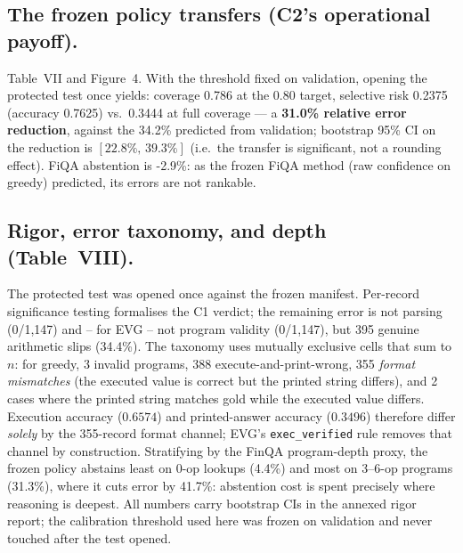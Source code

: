 \documentclass[conference]{IEEEtran}
\begin{document}
\subsection{The frozen policy transfers (C2's operational payoff).}
Table~VII and Figure~4. With the threshold fixed on validation, opening the protected test
once yields: coverage 0.786 at the 0.80 target, selective risk 0.2375 (accuracy 0.7625)
vs.\ 0.3444 at full coverage --- a \textbf{31.0\% relative error reduction}, against the
34.2\% predicted from validation; bootstrap 95\% CI on the reduction is $[22.8\%,\,39.3\%]$
(i.e.\ the transfer is significant, not a rounding effect). FiQA abstention is -2.9\%: as the frozen FiQA method (raw
confidence on greedy) predicted, its errors are not rankable.

\subsection{Rigor, error taxonomy, and depth (Table~VIII).}
The protected test was opened once against the frozen manifest. Per-record significance
testing formalises the C1 verdict; the remaining error is not parsing (0/1,147) and --
for EVG -- not program validity (0/1,147), but 395 genuine arithmetic slips (34.4\%).
The taxonomy uses mutually exclusive cells that sum to $n$: for greedy, 3 invalid
programs, 388 execute-and-print-wrong, 355 \emph{format mismatches} (the executed value is
correct but the printed string differs), and 2 cases where the printed string matches gold
while the executed value differs. Execution accuracy ($0.6574$) and printed-answer accuracy
($0.3496$) therefore differ \emph{solely} by the 355-record format channel; EVG's
\texttt{exec\_verified} rule removes that channel by construction. Stratifying by the FinQA
program-depth proxy, the frozen policy abstains least on 0-op lookups (4.4\%) and most on
3--6-op programs (31.3\%), where it cuts error by 41.7\%: abstention cost is spent precisely
where reasoning is deepest. All numbers carry bootstrap CIs in the annexed rigor report; the
calibration threshold used here was frozen on validation and never touched after the test
opened.
\end{document}
